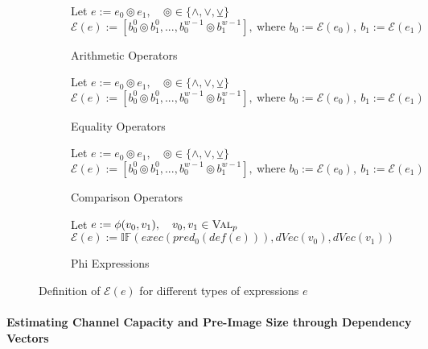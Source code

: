 \begin{figure}
\begin{subfigure}{1\textwidth}
    \end{subfigure}

    \begin{subfigure}{1\textwidth}
        \caption{Arithmetic Operators}
        Let $e := e_0 \circledcirc e_1, \quad \circledcirc \in \{ \land, \lor, \veebar \}$\\
        $\mathcal{E}(e) := [b_0^0 \circledcirc b_1^0, ... , b_0^{w-1} \circledcirc b_1^{w-1}], \: \text{where } b_0 := \mathcal{E}(e_0), \: b_1 := \mathcal{E}(e_1)$
        
    \end{subfigure}

    \begin{subfigure}{1\textwidth}
        \caption{Equality Operators}
        Let $e := e_0 \circledcirc e_1, \quad \circledcirc \in \{ \land, \lor, \veebar \}$\\
        $\mathcal{E}(e) := [b_0^0 \circledcirc b_1^0, ... , b_0^{w-1} \circledcirc b_1^{w-1}], \: \text{where } b_0 := \mathcal{E}(e_0), \: b_1 := \mathcal{E}(e_1)$
        
    \end{subfigure}

    \begin{subfigure}{1\textwidth}
        \caption{Comparison Operators}
        Let $e := e_0 \circledcirc e_1, \quad \circledcirc \in \{ \land, \lor, \veebar \}$\\
        $\mathcal{E}(e) := [b_0^0 \circledcirc b_1^0, ... , b_0^{w-1} \circledcirc b_1^{w-1}], \: \text{where } b_0 := \mathcal{E}(e_0), \: b_1 := \mathcal{E}(e_1)$
    \end{subfigure}

    \begin{subfigure}{1\textwidth}
        \caption{Phi Expressions}
        Let $e := \phi(v_0, v_1), \quad v_0, v_1 \in \textsc{Val}_p$\\
        $\mathcal{E}(e) := \mathbb{IF}(exec(pred_0(def(e))), dVec(v_0), dVec(v_1))$
    \end{subfigure}
    
    \caption{Definition of $\mathcal{E}(e)$ for different types of expressions $e$ }\label{fig:expr}
\end{figure}

\paragraph{Estimating Channel Capacity and Pre-Image Size through Dependency Vectors}

